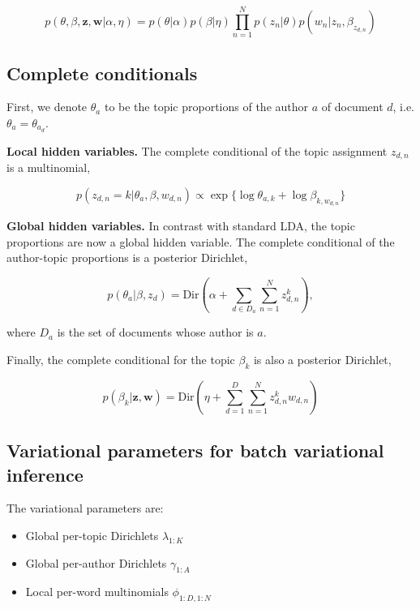 \begin{equation}
p(\theta,\beta,\mathbf{z},\mathbf{w}|\alpha,\eta) = p(\theta|\alpha) p(\beta|\eta) \prod_{n=1}^{N}{p(z_n|\theta)p(w_n|z_n,\beta_{z_{d,n}})}
\end{equation}


\subsection{Complete conditionals}

First, we denote $\theta_a$ to be the topic proportions of the author $a$ of document $d$, i.e. $\theta_a = \theta_{a_d}$.

\textbf{Local hidden variables.} The complete conditional of the topic assignment $z_{d,n}$ is a multinomial,

\begin{equation}
p(z_{d,n} = k | \theta_a, \beta, w_{d,n}) \propto \exp \{ \log \theta_{a,k} + \log \beta_{k,w_{d,n}} \}
\end{equation}

\textbf{Global hidden variables.} In contrast with standard LDA, the topic proportions are now a global hidden variable.
The complete conditional of the author-topic proportions is a posterior Dirichlet,

\begin{equation}
p(\theta_a | \beta, z_{d}) = \text{Dir} ( \alpha + \sum_{d \in D_a}{\sum_{n=1}^{N}{z^k_{d,n}}}),
\end{equation}

\noindent where $D_a$ is the set of documents whose author is $a$.

Finally, the complete conditional for the topic $\beta_k$ is also a posterior Dirichlet,

\begin{equation}
p(\beta_k | \mathbf{z}, \mathbf{w}) = \text{Dir} ( \eta + \sum_{d=1}^{D}{\sum_{n=1}^{N}{z^k_{d,n}w_{d,n}}})
\end{equation}



\subsection{Variational parameters for batch variational inference}

The variational parameters are:
\begin{itemize}
	\item Global per-topic Dirichlets $\lambda_{1:K}$
	\item Global per-author Dirichlets $\gamma_{1:A}$
	\item Local per-word multinomials $\phi_{1:D,1:N}$
\end{itemize}

